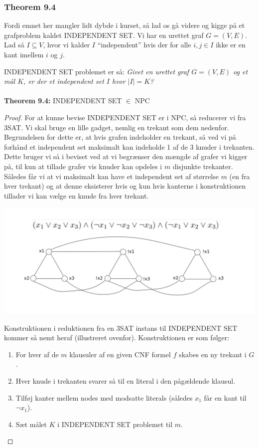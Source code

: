 \subsubsection{Theorem 9.4}

Fordi emnet her mangler lidt dybde i kurset, så lad os gå videre og kigge på et grafproblem kaldet INDEPENDENT SET. Vi har en urettet graf $G=(V,E)$. Lad så $I \subseteq V$, hvor vi kalder $I$ ``independent'' hvis der for alle $i,j \in I$ ikke er en kant imellem $i$ og $j$. 

INDEPENDENT SET problemet er så: \textit{Givet en urettet graf $G=(V,E)$ og et mål $K$, er der et independent set $I$ hvor $|I|=K$?}\\
~\\
\textbf{Theorem 9.4:} INDEPENDENT SET $\in$ NPC

\begin{proof}
 For at kunne bevise INDEPENDENT SET er i NPC, så reducerer vi fra 3SAT. Vi skal bruge en lille gadget, nemlig en trekant som dem nedenfor. Begrundelsen for dette er, at hvis grafen indeholder en trekant, så ved vi på forhånd et independent set maksimalt kan indeholde 1 af de 3 knuder i trekanten. Dette bruger vi så i beviset ved at vi begrænser den mængde af grafer vi kigger på, til kun at tillade grafer vis knuder kan opdeles i $m$ disjunkte trekanter. Således får vi at vi maksimalt kan have et independent set af størrelse $m$ (en fra hver trekant) og at denne eksisterer hvis og kun hvis kanterne i konstruktionen tillader vi kan vælge en knude fra hver trekant.
 \begin{center}
 \includegraphics[bb=0 0 842 595,scale=0.5]{./INDEPENDENTSET.png}
\end{center}
Konstruktionen i reduktionen fra en 3SAT instans til INDEPENDENT SET kommer så nemt heraf (illustreret ovenfor). Konstruktionen er som følger:

\begin{enumerate}
 \item For hver af de $m$ klausuler af en given CNF formel $f$ skabes en ny trekant i $G$.
 \item Hver knude i trekanten svarer så til en literal i den pågældende klausul.
 \item Tilføj kanter mellem nodes med modsatte literals (således $x_1$ får en kant til $\neg x_1$).
 \item Sæt målet $K$ i INDEPENDENT SET problemet til $m$.
\end{enumerate}


\end{proof}
